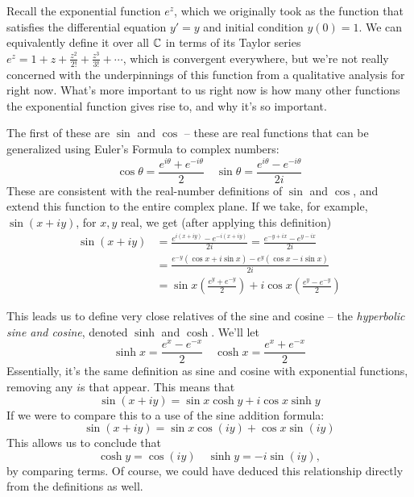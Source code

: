 \documentclass[12pt]{scrartcl}
\begin{document}
Recall the exponential function $e^z$, which we originally took as the function that satisfies the differential equation $y' = y$ and initial condition $y(0) = 1$. We can equivalently define it over all $\mathbb C$ in terms of its Taylor series $e^z = 1 + z + \frac{z^2}{2!}  + \frac{z^3}{3!} + \cdots$, which is convergent everywhere, but we're not really concerned with the underpinnings of this function from a qualitative analysis for right now. What's more important to us right now is how many other functions the exponential function gives rise to, and why it's so important.

The first of these are $\sin$ and $\cos$ -- these are real functions that can be generalized using Euler's Formula to complex numbers:
\[
	\cos \theta = \frac{e^{i\theta} + e^{-i\theta}}{2} \quad \sin \theta = \frac{e^{i\theta} - e^{-i\theta}}{2i}
\]
These are consistent with the real-number definitions of $\sin$ and $\cos$, and extend this function to the entire complex plane. If we take, for example, $\sin(x+iy)$, for $x, y$ real, we get (after applying this definition)
\begin{align*}
	\sin (x+iy) & = \frac{e^{i(x+iy)}- e^{-i(x+iy)}}{2i} = \frac{e^{-y + ix}- e^{y - ix}}{2i}                     \\
	            & = \frac{e^{-y}(\cos x + i \sin x) - e^{y}(\cos x - i \sin x)}{2i}                               \\
	            & = \sin x \left(\frac{e^y + e^{-y}}{2} \right) + i \cos x \left(\frac{e^{y} - e^{-y}}{2} \right)
\end{align*}

This leads us to define very close relatives of the sine and cosine -- the \textit{hyperbolic sine and cosine}, denoted $\sinh$ and $\cosh$. We'll let
\[
	\sinh x = \frac{e^{x} - e^{-x}}{2} \quad \cosh x = \frac{e^x + e^{-x}}{2}
\]
Essentially, it's the same definition as sine and cosine with exponential functions, removing any $i$s that appear. This means that
\[
	\sin(x +iy) = \sin x \cosh y + i \cos x \sinh y
\]
If we were to compare this to a use of the sine addition formula:
\[
	\sin(x + iy) = \sin x \cos(iy) + \cos x \sin(iy)
\]
This allows us to conclude that
\[
	\cosh y = \cos (iy) \quad \sinh y = -i \sin(iy),
\]
by comparing terms. Of course, we could have deduced this relationship directly from the definitions as well.
\end{document}
